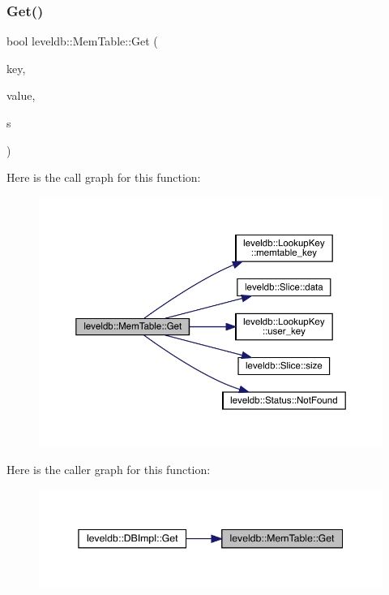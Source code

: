 \subsubsection{\texorpdfstring{Get()}{Get()}}
{\footnotesize\ttfamily bool leveldb\+::\+Mem\+Table\+::\+Get (\begin{DoxyParamCaption}\item[{const \mbox{\hyperlink{classleveldb_1_1_lookup_key}{Lookup\+Key}} \&}]{key,  }\item[{std\+::string $\ast$}]{value,  }\item[{\mbox{\hyperlink{classleveldb_1_1_status}{Status}} $\ast$}]{s }\end{DoxyParamCaption})}

Here is the call graph for this function\+:
\nopagebreak
\begin{figure}[H]
\begin{center}
\leavevmode
\includegraphics[width=350pt]{classleveldb_1_1_mem_table_af94f80a5909a440d0675afa68f8765c5_cgraph}
\end{center}
\end{figure}
Here is the caller graph for this function\+:
\nopagebreak
\begin{figure}[H]
\begin{center}
\leavevmode
\includegraphics[width=345pt]{classleveldb_1_1_mem_table_af94f80a5909a440d0675afa68f8765c5_icgraph}
\end{center}
\end{figure}
\mbox{\label{classleveldb_1_1_mem_table_a396b8ba5e2ea0de25b666026f3b9235f}} 
